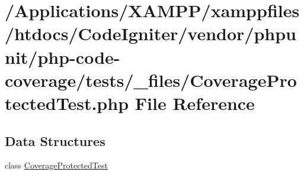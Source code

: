 \hypertarget{php-code-coverage_2tests_2__files_2_coverage_protected_test_8php}{}\section{/\+Applications/\+X\+A\+M\+P\+P/xamppfiles/htdocs/\+Code\+Igniter/vendor/phpunit/php-\/code-\/coverage/tests/\+\_\+files/\+Coverage\+Protected\+Test.php File Reference}
\label{php-code-coverage_2tests_2__files_2_coverage_protected_test_8php}
\subsection*{Data Structures}
\begin{DoxyCompactItemize}
\item 
class \mbox{\hyperlink{class_coverage_protected_test}{Coverage\+Protected\+Test}}
\end{DoxyCompactItemize}
